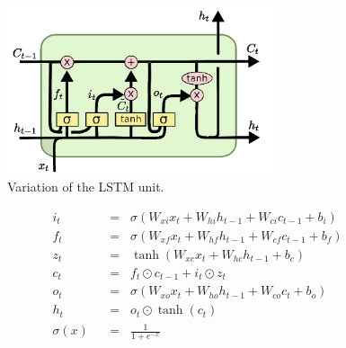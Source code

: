 \begin{figure}[!ht]
	\centering
	\includegraphics[width=0.7\textwidth]{./fig/LSTM3-var-peepholes.png}
	\caption{Variation of the LSTM unit.\cite{colah-lstm}
		\label{fig:lstm}}
\end{figure}

\belowdisplayskip=24pt
\begin{align}
	i_t \hspace{7pt}&=\hspace{7pt} \sigma(W_{xi}x_t + W_{hi}h_{t-1} + W_{ci}c_{t-1} + b_i) \label{eq:lstm1}\\
	f_t \hspace{7pt}&=\hspace{7pt} \sigma(W_{xf}x_t + W_{hf}h_{t-1} + W_{cf}c_{t-1} + b_f) \label{eq:lstm2}\\
	z_t \hspace{7pt}&=\hspace{7pt} \tanh(W_{xc}x_t + W_{hc}h_{t-1} + b_c) \label{eq:lstm3}\\
	c_t \hspace{7pt}&=\hspace{7pt} f_t\odot c_{t-1} + i_t\odot z_t \label{eq:lstm4}\\
	o_t \hspace{7pt}&=\hspace{7pt} \sigma(W_{xo}x_t + W_{ho}h_{t-1} + W_{co}c_t + b_o) \label{eq:lstm5}\\
	h_t \hspace{7pt}&=\hspace{7pt} o_t\odot \tanh(c_t) \label{eq:lstm6}\\[16pt]
	\sigma(x) \hspace{7pt}&=\hspace{7pt} \frac{1}{1+e^{-x}} \label{eq:lstm7}
\end{align}

